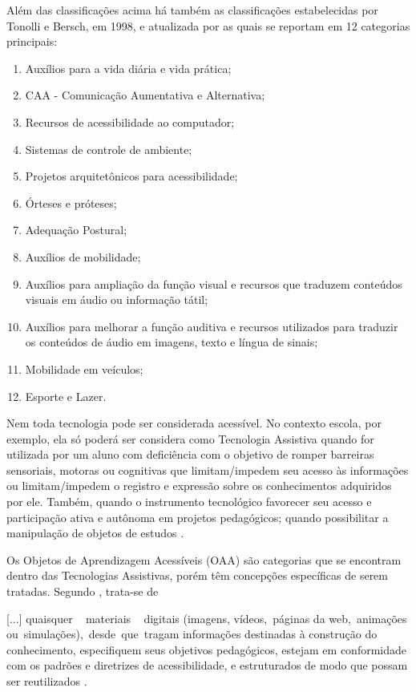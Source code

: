 \documentclass[portuguese]{textolivre}
\begin{document}
Além das classificações acima há também as classificações estabelecidas por
Tonolli e Bersch, em 1998, e atualizada por \textcite{bersch2017} as quais se reportam em 12 categorias principais:
\begin{enumerate}[label=\alph*)]
\item Auxílios para a vida diária e vida prática;
\item CAA - Comunicação Aumentativa e Alternativa;
\item Recursos de acessibilidade ao computador;
\item Sistemas de controle de ambiente;
\item Projetos arquitetônicos para acessibilidade;
\item Órteses e próteses;
\item Adequação Postural;
\item Auxílios de mobilidade;
\item Auxílios para ampliação da função visual e recursos que traduzem conteúdos visuais em áudio ou informação tátil;
\item Auxílios para melhorar a função auditiva e recursos utilizados para traduzir os conteúdos de áudio em imagens, texto e língua de sinais;
\item Mobilidade em veículos;
\item Esporte e Lazer.
\end{enumerate}

Nem toda tecnologia pode ser considerada acessível. No contexto escola,
por exemplo, ela só poderá ser considera como Tecnologia Assistiva
quando for utilizada por um aluno com deficiência com o objetivo de
romper barreiras sensoriais, motoras ou cognitivas que limitam/impedem
seu acesso às informações ou limitam/impedem o registro e expressão
sobre os conhecimentos adquiridos por ele. Também, quando o instrumento
tecnológico favorecer seu acesso e participação ativa e autônoma em
projetos pedagógicos; quando possibilitar a manipulação de objetos de
estudos \cite{bersch2013}.

Os Objetos de Aprendizagem Acessíveis
(OAA) são categorias que se encontram dentro das Tecnologias Assistivas,
porém têm concepções específicas de serem tratadas. Segundo \textcite{mourao2020}, trata-se de

{[}...{]} quaisquer ~ materiais ~
digitais (imagens, vídeos,~páginas da web,~animações
ou~simulações),~desde~que~tragam informações destinadas à construção do
conhecimento, especifiquem seus objetivos pedagógicos, estejam em
conformidade com os padrões e diretrizes de acessibilidade, e
estruturados de modo que possam ser reutilizados
\cite[p.~44]{mourao2020}.
\end{document}
